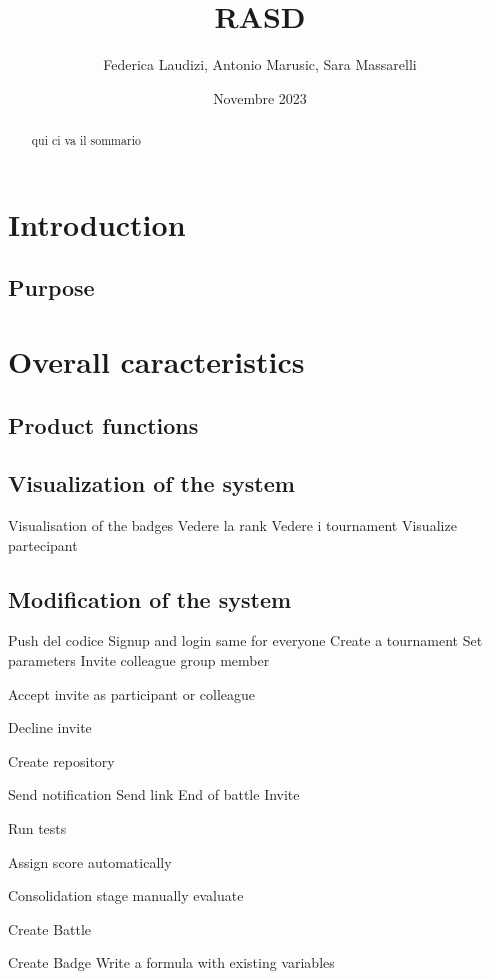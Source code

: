 \documentclass{article}
\title{RASD}
\author{Federica Laudizi, Antonio Marusic, Sara Massarelli}
\date{Novembre 2023}
\begin{document}
\maketitle

\tableofcontents

\begin{abstract}
    qui ci va il sommario
    \end{abstract}
    \section{Introduction} 
        \subsection{Purpose}

    \section{Overall caracteristics}
        \subsection{Product functions}
            \subsection{Visualization of the system}
            Visualisation of the badges
            Vedere la rank
            Vedere i tournament
            Visualize partecipant
            \subsection{Modification of the system}
            Push del codice
Signup and login same for everyone
Create a tournament
Set parameters 
Invite
    colleague
    group member

Accept invite
    as participant or colleague

Decline invite

Create repository

Send notification
    Send link
    End of battle
    Invite

Run tests 


Assign score automatically

Consolidation stage
    manually evaluate


Create Battle 

Create Badge
    Write a formula with existing variables
\end{document}
